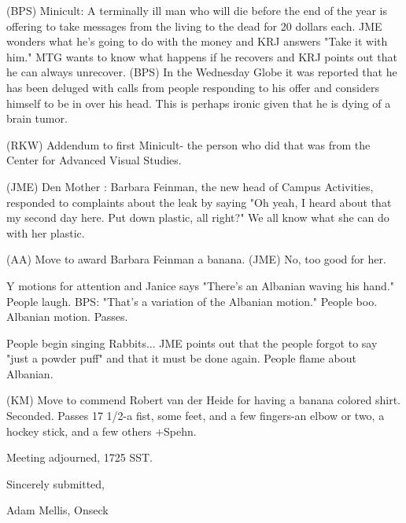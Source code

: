 \documentclass[12pt]{article}
\begin{document}
(BPS) Minicult: A terminally ill man who will die before the end of the year is offering to take messages from the living to the dead for 20 dollars each. JME wonders what he's going to do with the money and KRJ answers "Take it with him." MTG wants to know what happens if he recovers and KRJ points out that he can always unrecover. (BPS) In the Wednesday Globe it was reported that he has been deluged with calls from people responding to his offer and considers himself to be in over his head. This is perhaps ironic given that he is dying of a brain tumor.

(RKW) Addendum to first Minicult- the person who did that was from the Center for Advanced Visual Studies.

(JME) Den Mother      : Barbara Feinman, the new head of Campus Activities, responded to complaints about the leak by saying "Oh yeah, I heard about that my second day here. Put down plastic, all right?" We all know what she can do with her plastic.

(AA) Move to award Barbara Feinman a banana. (JME) No, too good for her.

Y motions for attention and Janice says "There's an Albanian waving his hand." People laugh. BPS: "That's a variation of the Albanian motion." People boo. Albanian motion. Passes.

People begin singing Rabbits... JME points out that the people forgot to say "just a powder puff" and that it must be done again. People flame about Albanian.

(KM) Move to commend Robert van der Heide for having a banana colored shirt. Seconded. Passes 17 1/2-a fist, some feet, and a few fingers-an elbow or two, a hockey stick, and a few others +Spehn.

\vspace{12pt}

\noindent
Meeting adjourned, 1725 SST.

\vspace{18pt}

\centerline{Sincerely submitted,}
\centerline{Adam Mellis, Onseck}
\end{document}
